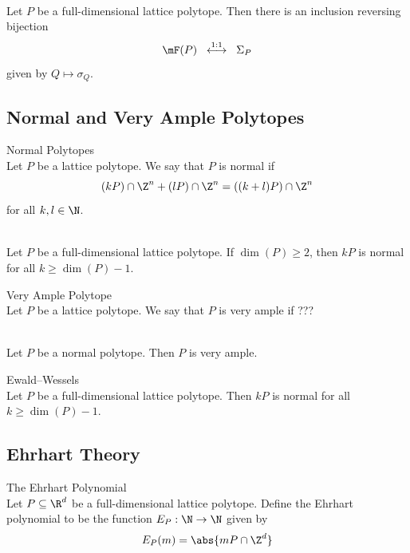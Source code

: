 \documentclass[a4paper]{article}
\begin{document}
\begin{prp}{}{}\\
Let $P$ be a full-dimensional lattice polytope. Then there is an inclusion reversing bijection $$\mF(P)\;\;\overset{1:1}{\longleftrightarrow}\;\;\Sigma_P$$ given by $Q\mapsto\sigma_Q$. 
\end{prp}

\subsection{Normal and Very Ample Polytopes}
\begin{defn}{Normal Polytopes}{}\\
Let $P$ be a lattice polytope. We say that $P$ is normal if $$(kP)\cap\Z^n+(lP)\cap\Z^n=((k+l)P)\cap\Z^n$$ for all $k,l\in\N$. 
\end{defn}

\begin{prp}{}{}\\
Let $P$ be a full-dimensional lattice polytope. If $\dim(P)\geq 2$, then $kP$ is normal for all $k\geq\dim(P)-1$. 
\end{prp}

\begin{defn}{Very Ample Polytope}{}\\
Let $P$ be a lattice polytope. We say that $P$ is very ample if ???
\end{defn}

\begin{prp}{}{}\\
Let $P$ be a normal polytope. Then $P$ is very ample. 
\end{prp}

\begin{thm}{Ewald–Wessels}{}\\
Let $P$ be a full-dimensional lattice polytope. Then $kP$ is normal for all $k\geq\dim(P)-1$. 
\end{thm}

\subsection{Ehrhart Theory}
\begin{defn}{The Ehrhart Polynomial}{}\\
Let $P\subseteq\R^d$ be a full-dimensional lattice polytope. Define the Ehrhart polynomial to be the function $E_P:\N\to\N$ given by $$E_P(m)=\abs{mP\cap\Z^d}$$
\end{defn}
\end{document}
